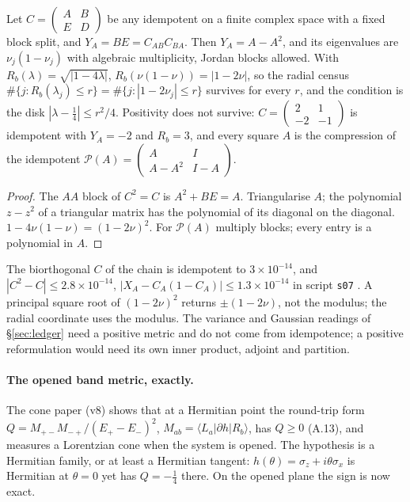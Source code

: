 \begin{theorem}\label{thm:open}
Let $C=\begin{pmatrix}A&B\\E&D\end{pmatrix}$ be any idempotent on a finite complex space with a fixed block split, and $Y_A=BE=C_{AB}C_{BA}$. Then $Y_A=A-A^2$, and its eigenvalues are $\nu_j(1-\nu_j)$ with algebraic multiplicity, Jordan blocks allowed. With $R_b(\lambda)=\sqrt{|1-4\lambda|}$, $R_b(\nu(1-\nu))=|1-2\nu|$, so the radial census $\#\{j:R_b(\lambda_j)\le r\}=\#\{j:|1-2\nu_j|\le r\}$ survives for every $r$, and the condition is the disk $|\lambda-\tfrac14|\le r^2/4$. Positivity does not survive: $C=\begin{pmatrix}2&1\\-2&-1\end{pmatrix}$ is idempotent with $Y_A=-2$ and $R_b=3$, and every square $A$ is the compression of the idempotent $\mathcal P(A)=\begin{pmatrix}A&I\\A-A^2&I-A\end{pmatrix}$. 
\end{theorem}
\begin{proof}
The $AA$ block of $C^2=C$ is $A^2+BE=A$. Triangularise $A$; the polynomial $z-z^2$ of a triangular matrix has the polynomial of its diagonal on the diagonal. $1-4\nu(1-\nu)=(1-2\nu)^2$. For $\mathcal P(A)$ multiply blocks; every entry is a polynomial in $A$.
\end{proof}
The biorthogonal $C$ of the chain is idempotent to $3\times10^{-14}$, and $|C^2-C|\le2.8\times10^{-14}$, $|X_A-C_A(1-C_A)|\le1.3\times10^{-14}$ in script \texttt{s07} . A principal square root of $(1-2\nu)^2$ returns $\pm(1-2\nu)$, not the modulus; the radial coordinate uses the modulus. The variance and Gaussian readings of §\ref{sec:ledger} need a positive metric and do not come from idempotence; a positive reformulation would need its own inner product, adjoint and partition.

\paragraph{The opened band metric, exactly.} The cone paper (v8) shows that at a Hermitian point the round-trip form $Q=M_{+-}M_{-+}/(E_+-E_-)^2$, $M_{ab}=\langle L_a|\partial h|R_b\rangle$, has $Q\ge0$ (A.13), and measures a Lorentzian cone when the system is opened. The hypothesis is a Hermitian family, or at least a Hermitian tangent: $h(\theta)=\sigma_z+i\theta\sigma_x$ is Hermitian at $\theta=0$ yet has $Q=-\tfrac14$ there. On the opened plane the sign is now exact.

